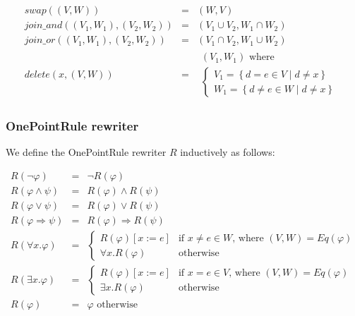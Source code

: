 \begin{equation*}
\begin{array}{lll}
swap\left( \left( V,W\right) \right)  & = & \left( W,V\right)  \\ 
join\_and\left( \left( V_{1},W_{1}\right) ,\left( V_{2},W_{2}\right) \right) 
& = & \left( V_{1}\cup V_{2},W_{1}\cap W_{2}\right)  \\ 
join\_or\left( \left( V_{1},W_{1}\right) ,\left( V_{2},W_{2}\right) \right) 
& = & \left( V_{1}\cap V_{2},W_{1}\cup W_{2}\right)  \\ 
delete\left( x,\left( V,W\right) \right)  & = & 
\begin{array}{l}
\left( V_{1},W_{1}\right) \text{ where} \\ 
\left\{ 
\begin{array}{c}
V_{1}=\left\{ d=e\in V\mid d\neq x\right\}  \\ 
W_{1}=\left\{ d\neq e\in W\mid d\neq x\right\} 
\end{array}%
\right. 
\end{array}%
\end{array}%
\end{equation*}

\subsubsection{OnePointRule rewriter}

We define the OnePointRule rewriter $R$ inductively as follows:

\begin{equation*}
\begin{array}{lll}
R\left( \lnot \varphi \right)  & = & \lnot R\left( \varphi \right)  \\ 
R\left( \varphi \wedge \psi \right)  & = & R\left( \varphi \right) \wedge
R\left( \psi \right)  \\ 
R\left( \varphi \vee \psi \right)  & = & R\left( \varphi \right) \vee
R\left( \psi \right)  \\ 
R\left( \varphi \Rightarrow \psi \right)  & = & R\left( \varphi \right)
\Rightarrow R\left( \psi \right)  \\ 
R\left( \forall x.\varphi \right)  & = & \left\{ 
\begin{array}{cc}
R\left( \varphi \right) \left[ x:=e\right]  & \text{if }x\neq e\in W\text{,
where }\left( V,W\right) =Eq\left( \varphi \right)  \\ 
\forall x.R\left( \varphi \right)  & \text{otherwise}%
\end{array}%
\right.  \\ 
R\left( \exists x.\varphi \right)  & = & \left\{ 
\begin{array}{cc}
R\left( \varphi \right) \left[ x:=e\right]  & \text{if }x=e\in V\text{,
where }\left( V,W\right) =Eq\left( \varphi \right)  \\ 
\exists x.R\left( \varphi \right)  & \text{otherwise}%
\end{array}%
\right.  \\ 
R\left( \varphi \right)  & = & \varphi \text{ otherwise}%
\end{array}%
\end{equation*}

\newpage 
